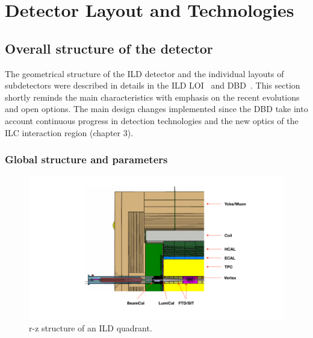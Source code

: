 \newcommand{\ilds}[1]{{\em#1}$^s$} %

\chapter{Detector Layout and Technologies}




\section{Overall structure of the detector}

The geometrical structure of the ILD detector and the individual layouts of subdetectors were described in details in the ILD LOI~\cite{ild:bib:ILDloi} and DBD~\cite{ild:bib:ILDDBD}. This section shortly reminds the main characteristics with emphasis on the recent evolutions and open options. The main design changes implemented since the DBD take into account continuous progress in detection technologies and the new optics of the ILC interaction region (chapter 3). 


\subsection{Global structure and parameters}


\begin{figure}[t!]
\centering
\includegraphics[width=0.9\hsize]{Detector/fig/ILD_quadrant_new_lstar.pdf}
\caption{r-z structure of an ILD quadrant.}
\label{fig:det:quad}
\end{figure}

